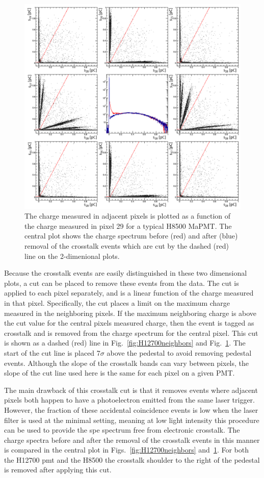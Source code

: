 \begin{figure}[hbt]
	\includegraphics[width=\linewidth]{figures/H8500_ct.png}
	\caption{The charge measured in adjacent pixels is plotted as a function of the charge measured in pixel 29 for a typical H8500 MaPMT. The central plot shows the charge spectrum before (red) and after (blue) removal of the crosstalk events which are cut by the dashed (red) line on the 2-dimenional plots.}
	\label{fig:H8500neighbors}
\end{figure}

Because the crosstalk events are easily distinguished in these two dimensional plots, a cut can be placed to remove these events from the data. The cut is applied to each pixel separately, and is a linear function of the charge measured in that pixel. Specifically, the cut places a limit on the maximum charge measured in the neighboring pixels. If the maximum neighboring charge is above the cut value for the central pixel\textquotesingle s measured charge, then the event is tagged as crosstalk and is removed from the charge spectrum for the central pixel. This cut is shown as a dashed (red) line in Fig.~\ref{fig:H12700neighbors} and Fig.~\ref{fig:H8500neighbors}. The start of the cut line is placed 7$\sigma$ above the pedestal to avoid removing pedestal events. Although the slope of the crosstalk bands can vary between pixels, the slope of the cut line used here is the same for each pixel on a given PMT. 

The main drawback of this crosstalk cut is that it removes events where adjacent pixels both happen to have a photoelectron emitted from the same laser trigger. However, the fraction of these accidental coincidence events is low when the laser filter is used at the minimal setting, meaning at low light intensity this procedure can be used to provide the spe spectrum free from electronic crosstalk. The charge spectra before and after the removal of the crosstalk events in this manner is compared in the central plot in Figs.~\ref{fig:H12700neighbors} and~\ref{fig:H8500neighbors}. For both the H12700 pmt and the H8500 the crosstalk shoulder to the right of the pedestal is removed after applying this cut. 
